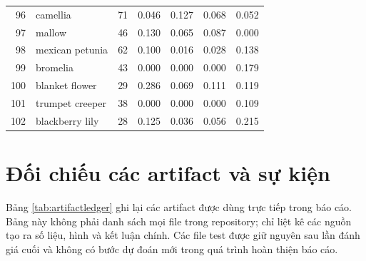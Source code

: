 \begin{longtable}{r l r r r r r}
96 & camellia & 71 & 0.046 & 0.127 & 0.068 & 0.052 \\
97 & mallow & 46 & 0.130 & 0.065 & 0.087 & 0.000 \\
98 & mexican petunia & 62 & 0.100 & 0.016 & 0.028 & 0.138 \\
99 & bromelia & 43 & 0.000 & 0.000 & 0.000 & 0.179 \\
100 & blanket flower & 29 & 0.286 & 0.069 & 0.111 & 0.119 \\
101 & trumpet creeper & 38 & 0.000 & 0.000 & 0.000 & 0.109 \\
102 & blackberry lily & 28 & 0.125 & 0.036 & 0.056 & 0.215 \\
\end{longtable}
\section{Đối chiếu các artifact và sự kiện}
Bảng \ref{tab:artifactledger} ghi lại các artifact được dùng trực tiếp trong báo cáo. Bảng này không phải danh sách mọi file trong repository; chỉ liệt kê các nguồn tạo ra số liệu, hình và kết luận chính. Các file test được giữ nguyên sau lần đánh giá cuối và không có bước dự đoán mới trong quá trình hoàn thiện báo cáo.
